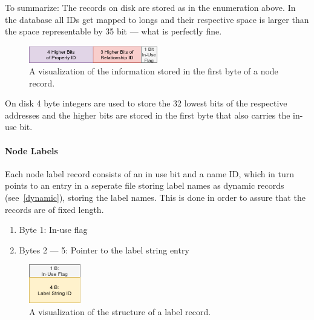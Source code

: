                 To summarize: The records on disk are stored as in the enumeration above. 
                In the database all IDs get mapped to longs and their respective space is larger than the space representable by 35 bit --- what is perfectly fine.
            
                \begin{figure}[htp]\label{node_first_byte}
                    \begin{center}
                        \includegraphics[keepaspectratio,height=0.4\textheight,width=0.5\textwidth]{img/03_record/node/node_first_byte.png}
                    \end{center}
                    \caption{A visualization of the information stored in the first byte of a node record.} %
                \end{figure}
            
                On disk 4 byte integers are used to store the 32 lowest bits of the respective addresses and the higher bits are stored in the first byte that also carries the in-use bit.
            
            \paragraph{Node Labels}
                Each node label record consists of an in use bit and a name ID, which in turn points to an entry in a seperate file storing label names as dynamic records (see~\ref{dynamic}), storing the label names.
                This is done in order to assure that the records are of fixed length.
                \begin{enumerate}
                    \item Byte 1: In-use flag
                    \item Bytes 2 --- 5: Pointer to the label string entry
                \end{enumerate}
                
                \begin{figure}[htp]\label{label_record}
                    \begin{center}
                        \includegraphics[keepaspectratio,height=0.2\textheight,width=0.2\textwidth]{img/03_record/node/label_record.png}
                    \end{center}
                    \caption{A visualization of the structure of a label record.} %
                \end{figure}
                

